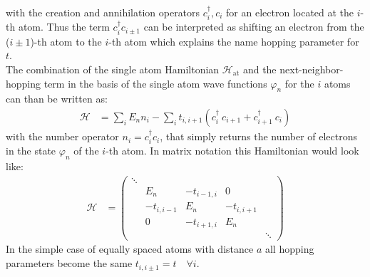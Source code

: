 with the creation and annihilation operators $c^\dagger_i, c_i$ for an electron located at the $i$-th atom. Thus the term $c_i^\dagger c_{i\pm1}$ can be interpreted as shifting an electron from the ($i\pm1$)-th atom to the $i$-th atom which explains the name hopping parameter for $t$.\\
The combination of the single atom Hamiltonian $\mathcal{H}_\text{at}$ and the next-neighbor-hopping term in the basis of the single atom wave functions $\varphi_n$ for the $i$ atoms can than be written as:
\begin{align}
	\mathcal{H} &= \sum_i E_n n_i - \sum_i t_{i, i+1} \left(c_i^\dagger\  c_{i+1} + c_{i+1}^\dagger\  c_i\right)
\end{align}
with the number operator $n_i = c^\dagger_i c_i$, that simply returns the number of electrons in the state $\varphi_n$ of the $i$-th atom. In matrix notation this Hamiltonian would look like:
\begin{align}
	\mathcal{H} &= \begin{pmatrix*}
	\ddots&&&\\
	&E_n&-t_{i-1, i}&0\\
	&-t_{i, i-1}&E_n&-t_{i, i+1}\\
	&0&-t_{i+1, i}&E_n&\\
	&&&&\ddots
	\end{pmatrix*}
\end{align}
In the simple case of equally spaced atoms with distance $a$ all hopping parameters become the same $t_{i, i\pm1} = t\quad\forall  i$. 

